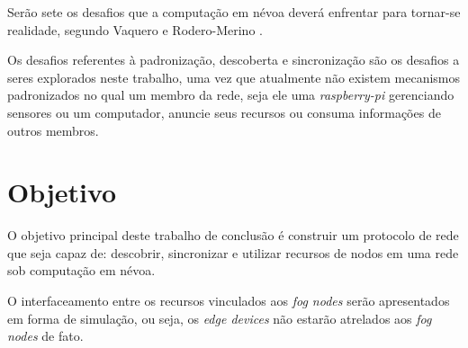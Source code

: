 Serão sete os desafios que a computação em névoa deverá enfrentar para tornar-se realidade, segundo Vaquero e Rodero-Merino \cite{Vaquero:2014}.

Os desafios referentes à padronização, descoberta e sincronização são os desafios a seres explorados neste trabalho, uma vez que atualmente não existem mecanismos padronizados no qual um membro da rede, seja ele uma \textit{raspberry-pi} gerenciando sensores ou um computador, anuncie seus recursos ou consuma informações de outros membros.

\section{Objetivo}

O objetivo principal deste trabalho de conclusão é construir um protocolo de rede que seja capaz de: descobrir, sincronizar e utilizar recursos de nodos em uma rede sob computação em névoa.

O interfaceamento entre os recursos vinculados aos \textit{fog nodes} serão apresentados em forma de simulação, ou seja,
os \textit{edge devices} não estarão atrelados aos \textit{fog nodes} de fato.







 
 
 
 
 
 
 
 










